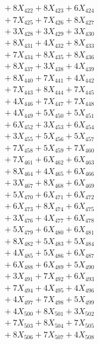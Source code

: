 \documentclass[a4paper,10pt]{article}
\begin{document}
{\begin{align}
&\;  + 8 X_{422} + 8 X_{423} + 6 X_{424} \\[0.3ex]
&\;  + 7 X_{425} + 7 X_{426} + 8 X_{427} \\[0.3ex]
&\;  + 3 X_{428} + 3 X_{429} + 3 X_{430} \\[0.5ex]\allowbreak
&\;  + 8 X_{431} + 4 X_{432} + 8 X_{433} \\[0.3ex]
&\;  + 7 X_{434} + 8 X_{435} + 8 X_{436} \\[0.3ex]
&\;  + 8 X_{437} + 3 X_{438} + 4 X_{439} \\[0.3ex]
&\;  + 8 X_{440} + 7 X_{441} + 4 X_{442} \\[0.3ex]
&\;  + 7 X_{443} + 8 X_{444} + 7 X_{445} \\[0.3ex]
&\;  + 4 X_{446} + 7 X_{447} + 7 X_{448} \\[0.3ex]
&\;  + 4 X_{449} + 5 X_{450} + 5 X_{451} \\[0.3ex]
&\;  + 6 X_{452} + 3 X_{453} + 6 X_{454} \\[0.3ex]
&\;  + 3 X_{455} + 5 X_{456} + 5 X_{457} \\[0.3ex]
&\;  + 7 X_{458} + 5 X_{459} + 7 X_{460} \\[0.5ex]\allowbreak
&\;  + 7 X_{461} + 6 X_{462} + 6 X_{463} \\[0.3ex]
&\;  + 8 X_{464} + 4 X_{465} + 6 X_{466} \\[0.3ex]
&\;  + 3 X_{467} + 8 X_{468} + 6 X_{469} \\[0.3ex]
&\;  + 5 X_{470} + 6 X_{471} + 6 X_{472} \\[0.3ex]
&\;  + 6 X_{473} + 8 X_{474} + 6 X_{475} \\[0.3ex]
&\;  + 3 X_{476} + 4 X_{477} + 6 X_{478} \\[0.3ex]
&\;  + 5 X_{479} + 6 X_{480} + 6 X_{481} \\[0.3ex]
&\;  + 8 X_{482} + 5 X_{483} + 5 X_{484} \\[0.3ex]
&\;  + 4 X_{485} + 5 X_{486} + 6 X_{487} \\[0.3ex]
&\;  + 6 X_{488} + 6 X_{489} + 5 X_{490} \\[0.5ex]\allowbreak
&\;  + 3 X_{491} + 7 X_{492} + 6 X_{493} \\[0.3ex]
&\;  + 7 X_{494} + 4 X_{495} + 4 X_{496} \\[0.3ex]
&\;  + 4 X_{497} + 7 X_{498} + 5 X_{499} \\[0.3ex]
&\;  + 4 X_{500} + 8 X_{501} + 3 X_{502} \\[0.3ex]
&\;  + 7 X_{503} + 8 X_{504} + 7 X_{505} \\[0.3ex]
&\;  + 8 X_{506} + 7 X_{507} + 4 X_{508} \\[0.3ex]

\end{align}}
\end{document}
